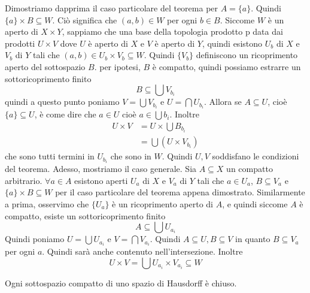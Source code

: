 \documentclass[a4paper]{article}
\begin{document}
\begin{snippetproof}{}
    Dimostriamo dapprima il caso particolare del teorema per
    \(A = \{a\}\).
    Quindi \(\{a\} \times B \subseteq W\).
    Ciò significa che \((a,b) \in W\) per ogni \(b\in B\).
    Siccome \(W\) è un aperto di \(X\times Y\),
    sappiamo che una base della topologia prodotto p data
    dai prodotti \(U \times V\) dove \(U\) è aperto di \(X\) e \(V\) è aperto di \(Y\),
    quindi esistono \(U_b\) di \(X\) e \(V_b\) di \(Y\)
    tali che \((a,b) \in U_b \times V_b \subseteq W\).
    Quindi \(\{V_b\}\) definiscono un ricoprimento aperto del sottospazio \(B\).
    per ipotesi, \(B\) è compatto, quindi possiamo estrarre un sottoricoprimento finito
    \[
        B \subseteq \bigcup V_{b_i}
    \]
    quindi a questo punto
    poniamo \(V = \bigcup V_{b_i}\) e \(U = \bigcap U_{b_i}\).
    Allora se \(A \subseteq U\), cioè \(\{a\} \subseteq U\),
    è come dire che \(a \in U\) cioè \(a \in \bigcup b_i\).
    Inoltre \begin{align*}
        U \times V &= U \times \bigcup B_{b_i} \\
        &= \bigcup (U \times V_{b_i})
    \end{align*}
    che sono tutti termini in \(U_{b_i}\) che sono in \(W\).
    Quindi \(U, V\) soddisfano le condizioni del teorema.
    Adesso, mostriamo il caso generale.
    Sia \(A \subseteq X\) un compatto arbitrario.
    \(\forall a \in A\) esistono aperti \(U_a\) di \(X\) e \(V_a\) di \(Y\)
    tali che \(a \in U_a\), \(B \subseteq V_a\) e \(\{a\} \times B \subseteq W\)
    per il caso particolare del teorema appena dimostrato.
    Similarmente a prima, osservimo che \(\{U_a\}\) è un ricoprimento aperto
    di \(A\), e quindi siccome \(A\) è compatto, esiste un sottoricoprimento finito
    \[
        A \subseteq \bigcup U_{a_i}
    \]
    Quindi poniamo \(U = \bigcup U_{a_i}\) e \(V = \bigcap V_{a_i}\).
    Quindi \(A \subseteq U, B \subseteq V\)
    in quanto \(B \subseteq V_a\) per ogni \(a\).
    Quindi sarà anche contenuto nell'intersezione. Inoltre
    \[
        U \times V = \bigcup U_{a_i} \times V_{a_i} \subseteq W
    \]
\end{snippetproof}

\begin{snippetcorollary}{}
    Ogni sottospazio compatto di uno spazio di Hausdorff
    è chiuso.
\end{snippetcorollary}
\end{document}
